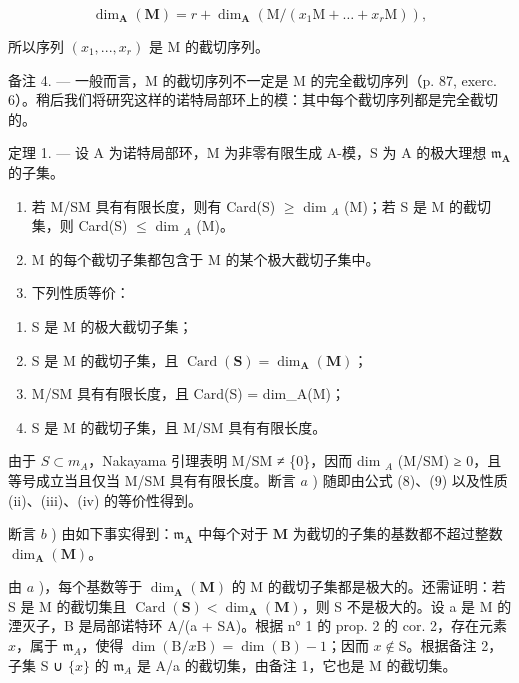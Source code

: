 \[
\dim_ {\mathbf {A}} (\mathbf {M}) = r + \dim_ {\mathbf {A}} \left(\mathrm{M} / (x _ {1} \mathrm{M} + \dots + x _ {r} \mathrm{M})\right),
\]

所以序列 \((x_{1},...,x_{r})\) 是 M 的截切序列。

备注 4. --- 一般而言，M 的截切序列不一定是 M 的完全截切序列（p. 87, exerc. 6）。稍后我们将研究这样的诺特局部环上的模：其中每个截切序列都是完全截切的。

定理 1. --- 设 A 为诺特局部环，M 为非零有限生成 A-模，S 为 A 的极大理想 \(\mathfrak{m}_{\mathbf{A}}\) 的子集。

\begin{enumerate}
\def\labelenumi{\alph{enumi})}
\item
  若 M/SM 具有有限长度，则有 Card(S) \(\geqslant\) dim \(_{A}\) (M)；若 S 是 M 的截切集，则 Card(S) \(\leqslant\) dim \(_{A}\) (M)。
\item
  M 的每个截切子集都包含于 M 的某个极大截切子集中。
\item
  下列性质等价：
\end{enumerate}

\begin{enumerate}
\def\labelenumi{(\roman{enumi})}
\item
  S 是 M 的极大截切子集；
\item
  S 是 M 的截切子集，且 \(\operatorname{Card}(\mathbf{S}) = \dim_{\mathbf{A}}(\mathbf{M})\)；
\item
  M/SM 具有有限长度，且 Card(S) = dim\_A(M)；
\item
  S 是 M 的截切子集，且 M/SM 具有有限长度。
\end{enumerate}

由于 \(S \subset m_{A}\)，Nakayama 引理表明 M/SM ≠ \{0\}，因而 dim \(_{A}\) (M/SM) ≥ 0，且等号成立当且仅当 M/SM 具有有限长度。断言 \(a\) ) 随即由公式 (8)、(9) 以及性质 (ii)、(iii)、(iv) 的等价性得到。

断言 \(b\) ) 由如下事实得到：\(\mathfrak{m}_{\mathbf{A}}\) 中每个对于 \(\mathbf{M}\) 为截切的子集的基数都不超过整数 \(\dim_{\mathbf{A}}(\mathbf{M})\)。

由 \(a\) )，每个基数等于 \(\dim_{\mathbf{A}}(\mathbf{M})\) 的 M 的截切子集都是极大的。还需证明：若 S 是 M 的截切集且 \(\operatorname{Card}(\mathbf{S}) < \dim_{\mathbf{A}}(\mathbf{M})\)，则 S 不是极大的。设 a 是 M 的湮灭子，B 是局部诺特环 A/(a + SA)。根据 n° 1 的 prop. 2 的 cor. 2，存在元素 \(x\)，属于 \(\mathfrak{m}_{A}\)，使得 \(\dim(\mathrm{B}/x\mathrm{B}) = \dim(\mathrm{B}) - 1\)；因而 \(x \notin \mathrm{S}\)。根据备注 2，子集 S ∪ \(\{x\}\) 的 \(\mathfrak{m}_{A}\) 是 A/a 的截切集，由备注 1，它也是 M 的截切集。


